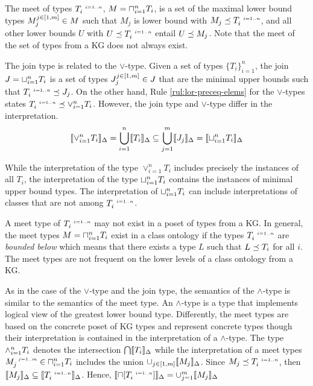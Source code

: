 \documentclass[runningheads]{llncs}
\newcommand{\s}{\scriptscriptstyle\ \,}
\newcommand{\llb}{\llbracket}
\newcommand{\rrb}{\rrbracket}
\begin{document}
The meet of types $T_i^{\s\/i=1..n}$, $M=\sqcap_{i=1}^n\/T_i$, is a
set of the maximal lower bound types $M_j^{j\in[1,m]}\in\/M$ such that
$M_j$ is lower bound with $M_j\preceq\/T_i^{\s\/i=1..n}$, and all
other lower bounds $U$ with $U\preceq\/T_i^{\s\/i=1..n}$ entail
$U\preceq\/M_j$. Note that the meet of the set of types from a KG does
not always exist.

The join type is related to the $\lor$-type. Given a set of types
$\{T_i\}_{i=1}^n$, the join $J=\sqcup_{i=1}^n\/T_i$ is a set of types
$J_j^{j\in[1,m]}\in\/J$ that are the minimal upper bounds such that
$T_i^{\s\/i=1..n}\preceq\/J_j$. On the other hand, Rule
\ref{rul:lor-preceq-elems} for the $\lor$-types states
$T_i^{\s\/i=1..n}\preceq\lor_{i=1}^n\/T_i$. However, the join type and
$\lor$-type differ in the interpretation.
$$\llb\lor_{i=1}^n\/T_i\rrb_\D=\bigcup_{i=1}^n\llb\/T_i\rrb_\D\subseteq\bigcup_{j=1}^m\llb\/J_j\rrb_\D=\llb\sqcup_{i=1}^n\/T_i\rrb_\D$$

While the interpretation of the type $\lor_{i=1}^nT_i$ includes
precisely the instances of all $T_i$, the interpretation of the type
$\sqcup_{i=1}^n\/T_i$ contains the instances of minimal upper bound
types. The interpretation of $\sqcup_{i=1}^n\/T_i$ can include
interpretations of classes that are not among $T_i^{\s\/i=1..n}$.

A meet type of $T_i^{\s\/i=1..n}$ may not exist in a poset of types
from a KG. In general, the meet types $M=\sqcap_{i=1}^n\/T_i$ exist in
a class ontology if the types $T_i^{\s\/i=1..n}$ are \emph{bounded
  below} \cite{Pierce2002} which means that there exists a type $L$
such that $L\preceq\/T_i$ for all $i$. The meet types are not frequent
on the lower levels of a class ontology from a KG.

As in the case of the $\lor$-type and the join type, the semantics of
the $\land$-type is similar to the semantics of the meet type. An
$\land$-type is a type that implements logical view of the greatest
lower bound type. Differently, the meet types are based on the
concrete poset of KG types and represent concrete types though their
interpretation is contained in the interpretation of a
$\land$-type. The type $\land_{i=1}^n\/T_i$ denotes the intersection
$\bigcap\/\llb\/T_i\rrb_\D$ while the interpretation of a meet types
$M_j^{\s\/j=1..m}\in\sqcap_{i=1}^n\/T_i$ includes the union
$\cup_{j\in[1,m]}\llb\/M_j\rrb_\D$. Since
$M_j\preceq\/T_i^{\s\/i=1..n}$, then
$\llb\/M_j\rrb_\D\subseteq\llb\/T_i^{\s\/i=1..n}\rrb_\D$. Hence,
$\llb\sqcap[T_i^{\s\/i=1..n}]\rrb_\D=\cup_{j=1}^m\llb\/M_j\rrb_\D$
\end{document}
